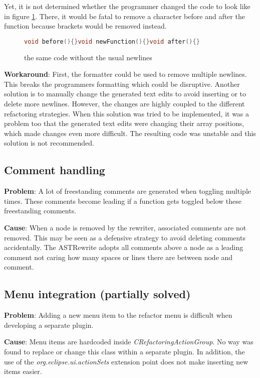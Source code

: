 Yet, it is not determined whether the programmer changed the code to look like 
in figure \ref{commentB}. There, it would be fatal to remove a character before 
and after the function because brackets would be removed instead.

\begin{figure}[h]
\begin{lstlisting}[language=C++]
void before(){}void newFunction(){}void after(){}
\end{lstlisting}
\setlength{\abovecaptionskip}{-20pt}
\caption{the same code without the usual newlines}
\label{commentB}
\end{figure}

\textbf{Workaround}: First, the formatter could be used to remove multiple 
newlines. This breaks the programmers formatting which could be disruptive. 
Another solution is to manually change the generated text edits to avoid 
inserting or to delete more newlines. However, the changes are highly coupled to 
the different refactoring strategies. When this solution was tried to be 
implemented, it was a problem too that the generated text edits were changing 
their array positions, which made changes even more difficult. The resulting 
code was unstable and this solution is not recommended. 

\subsection{Comment handling}
\textbf{Problem}: A lot of freestanding comments are generated when
toggling multiple times. These comments become leading if a function gets
toggled below these freestanding comments.

\textbf{Cause}: When a node is removed by the rewriter, associated comments are 
not removed. This may be seen as a defensive strategy to avoid deleting comments 
accidentally. The ASTRewrite adopts all comments above a node as a leading
comment not caring how many spaces or lines there are between node and comment.

\subsection{Menu integration (partially solved)}
\textbf{Problem}: Adding a new menu item to the refactor menu is difficult when 
developing a separate plugin.

\textbf{Cause}: Menu items are hardcoded inside
\textit{CRefactoringActionGroup}. No way was found to replace or change this 
class within a separate plugin. In addition, the use of the 
\textit{org.eclipse.ui.actionSets} extension point does not make inserting new 
items easier.

